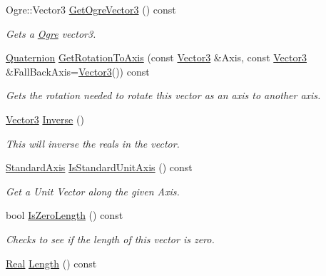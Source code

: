\begin{DoxyCompactItemize}
Ogre::Vector3 \hyperlink{classMezzanine_1_1Vector3_a2948167508c456d64032acfc8c2f6fd8}{GetOgreVector3} () const 
\begin{DoxyCompactList}\small\item\em Gets a \hyperlink{namespaceOgre}{Ogre} vector3. \item\end{DoxyCompactList}\item 
\hyperlink{classMezzanine_1_1Quaternion}{Quaternion} \hyperlink{classMezzanine_1_1Vector3_a91069c5b8e91ef68950c96e87d33a453}{GetRotationToAxis} (const \hyperlink{classMezzanine_1_1Vector3}{Vector3} \&Axis, const \hyperlink{classMezzanine_1_1Vector3}{Vector3} \&FallBackAxis=\hyperlink{classMezzanine_1_1Vector3}{Vector3}()) const 
\begin{DoxyCompactList}\small\item\em Gets the rotation needed to rotate this vector as an axis to another axis. \item\end{DoxyCompactList}\item 
\hyperlink{classMezzanine_1_1Vector3}{Vector3} \hyperlink{classMezzanine_1_1Vector3_a99846b5e24df4d20391465cf321d3a6c}{Inverse} ()
\begin{DoxyCompactList}\small\item\em This will inverse the reals in the vector. \item\end{DoxyCompactList}\item 
\hyperlink{namespaceMezzanine_ab41a00a8c6a47b576dc987ec34e16ba1}{StandardAxis} \hyperlink{classMezzanine_1_1Vector3_a854b61a98d10deacdfbcfea5a2ae68d8}{IsStandardUnitAxis} () const 
\begin{DoxyCompactList}\small\item\em Get a Unit Vector along the given Axis. \item\end{DoxyCompactList}\item 
bool \hyperlink{classMezzanine_1_1Vector3_a53693560fdec94b3a29f5bb2374f57de}{IsZeroLength} () const 
\begin{DoxyCompactList}\small\item\em Checks to see if the length of this vector is zero. \item\end{DoxyCompactList}\item 
\hyperlink{namespaceMezzanine_a726731b1a7df72bf3583e4a97282c6f6}{Real} \hyperlink{classMezzanine_1_1Vector3_a341a80e6b5eb23e381a81b2e8c1f7cdb}{Length} () const 

\end{DoxyCompactItemize}
